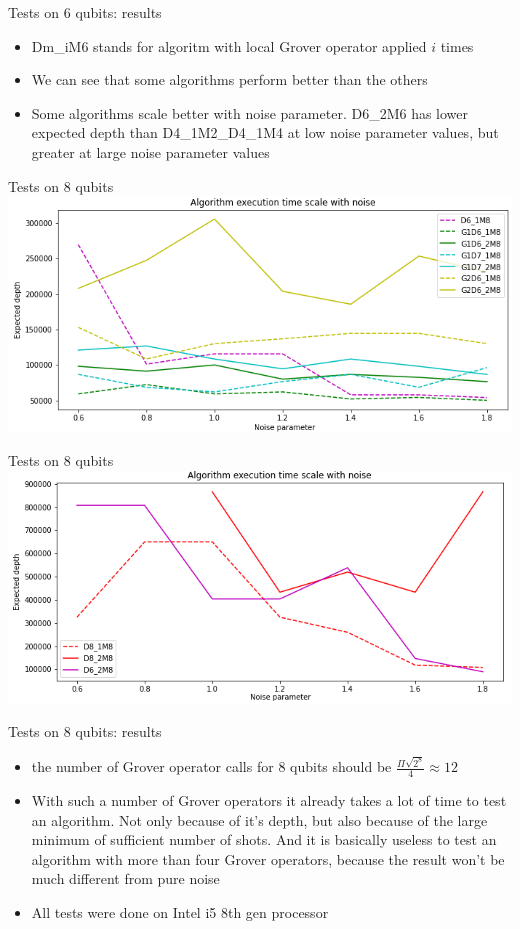 \documentclass[14pt,aspectratio=169,hyperref={pdftex,unicode},xcolor=dvipsnames]{beamer}
\begin{document}
\begin{frame}{Tests on 6 qubits: results}
	\begin{itemize}
		\item Dm\_iM6 stands for algoritm with local Grover operator applied $i$ times
		\item We can see that some algorithms perform better than the others
		\item Some algorithms scale better with noise parameter. D6\_2M6 has lower expected depth than D4\_1M2\_D4\_1M4 at low noise parameter values, but greater at large noise parameter values
	\end{itemize}
\end{frame}

\begin{frame}{Tests on 8 qubits}
		\includegraphics[width=14cm]{images/8_qubit_tests1.png}
\end{frame}

\begin{frame}{Tests on 8 qubits}
	\includegraphics[width=14cm]{images/8_qubit_tests2.png}
\end{frame}

\begin{frame}{Tests on 8 qubits: results}
	\begin{itemize}	
		\item the number of Grover operator calls for 8 qubits should be ${\frac{\Pi\sqrt{2^8}}{4}} \approx 12$
		\item With such a number of Grover operators it already takes a lot of time to test an algorithm. Not only because of it's depth, but also because of the large minimum of sufficient number of shots. And it is basically useless to test an algorithm with more than four Grover operators, because the result won't be much different from pure noise
		\item All tests were done on Intel i5 8th gen processor 
	\end{itemize}	
\end{frame}
\end{document}
